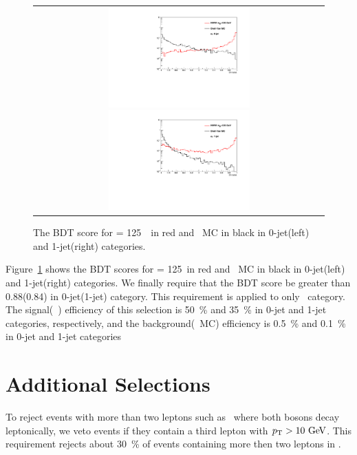 \begin{figure}[htp] 
\centering
\begin{tabular}{c} 
\includegraphics[width=0.5\textwidth]{figures/dymva_0j.pdf} 
\includegraphics[width=0.5\textwidth]{figures/dymva_1j.pdf} 
\end{tabular} 
\caption{The BDT score for \mHi = 125~\GeV\ in red and \dyll\ MC in black
in 0-jet(left) and 1-jet(right) categories.} 
\label{fig:dymva} 
\end{figure} 

Figure~\ref{fig:dymva} shows the BDT scores for \mHi = 125~\GeV in red 
and \dyll\ MC in black in 0-jet(left) and 1-jet(right) categories. We finally require 
that the BDT score be greater than 0.88(0.84) in 0-jet(1-jet) category. 
This requirement is applied to only \SF\ category. 
The signal(~\GeV) efficiency of this selection is 50~\% and 35~\% 
in 0-jet and 1-jet categories, respectively, 
and the background(\dyll\ MC) efficiency is 0.5~\% and 0.1~\% in 0-jet and 1-jet categories

\section{Additional Selections}

To reject events with more than two leptons such as \vv\ where both bosons decay leptonically, 
we veto events if they contain a third lepton with $p_\mathrm{T}>10~\mathrm{Ge\kern -0.1em V}$. 
This requirement rejects about 30~\% of events containing more then two leptons in \vv. 


